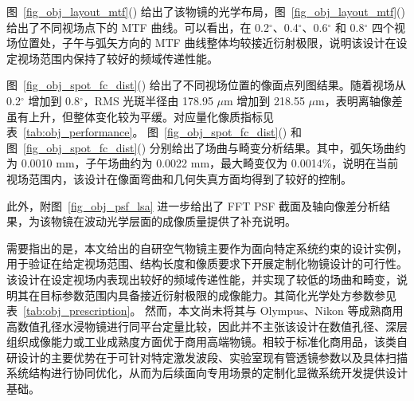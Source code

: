图~\ref{fig_obj_layout_mtf}() 给出了该物镜的光学布局，图~\ref{fig_obj_layout_mtf}() 给出了不同视场点下的 MTF 曲线。可以看出，在 0.2$^\circ$、0.4$^\circ$、0.6$^\circ$ 和 0.8$^\circ$ 四个视场位置处，子午与弧矢方向的 MTF 曲线整体均较接近衍射极限，说明该设计在设定视场范围内保持了较好的频域传递性能。

图~\ref{fig_obj_spot_fc_dist}() 给出了不同视场位置的像面点列图结果。随着视场从 0.2$^\circ$ 增加到 0.8$^\circ$，RMS 光斑半径由 178.95 $\mu$m 增加到 218.55 $\mu$m，表明离轴像差虽有上升，但整体变化较为平缓。对应量化像质指标见表~\ref{tab:obj_performance}。
图~\ref{fig_obj_spot_fc_dist}() 和图~\ref{fig_obj_spot_fc_dist}() 分别给出了场曲与畸变分析结果。其中，弧矢场曲约为 0.0010 mm，子午场曲约为 0.0022 mm，最大畸变仅为 0.0014\%，说明在当前视场范围内，该设计在像面弯曲和几何失真方面均得到了较好的控制。

此外，附图~\ref{fig_obj_psf_lsa} 进一步给出了 FFT PSF 截面及轴向像差分析结果，为该物镜在波动光学层面的成像质量提供了补充说明。

需要指出的是，本文给出的自研空气物镜主要作为面向特定系统约束的设计实例，用于验证在给定视场范围、结构长度和像质要求下开展定制化物镜设计的可行性。该设计在设定视场内表现出较好的频域传递性能，并实现了较低的场曲和畸变，说明其在目标参数范围内具备接近衍射极限的成像能力。其简化光学处方参数参见表~\ref{tab:obj_prescription}。
然而，本文尚未将其与 Olympus、Nikon 等成熟商用高数值孔径水浸物镜进行同平台定量比较，因此并不主张该设计在数值孔径、深层组织成像能力或工业成熟度方面优于商用高端物镜。相较于标准化商用品，该类自研设计的主要优势在于可针对特定激发波段、实验室现有管透镜参数以及具体扫描系统结构进行协同优化，从而为后续面向专用场景的定制化显微系统开发提供设计基础。

